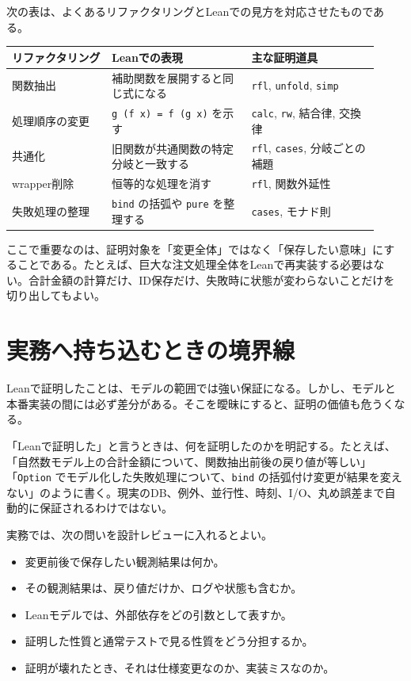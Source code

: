 次の表は、よくあるリファクタリングとLeanでの見方を対応させたものである。

\begin{longtable}{p{0.25\linewidth}p{0.35\linewidth}p{0.32\linewidth}}
\toprule
リファクタリング & Leanでの表現 & 主な証明道具 \\
\midrule
関数抽出 & 補助関数を展開すると同じ式になる & \texttt{rfl}, \texttt{unfold}, \texttt{simp} \\
処理順序の変更 & \texttt{g (f x) = f (g x)} を示す & \texttt{calc}, \texttt{rw}, 結合律, 交換律 \\
共通化 & 旧関数が共通関数の特定分岐と一致する & \texttt{rfl}, \texttt{cases}, 分岐ごとの補題 \\
wrapper削除 & 恒等的な処理を消す & \texttt{rfl}, 関数外延性 \\
失敗処理の整理 & \texttt{bind} の括弧や \texttt{pure} を整理する & \texttt{cases}, モナド則 \\
\bottomrule
\end{longtable}

ここで重要なのは、証明対象を「変更全体」ではなく「保存したい意味」にすることである。たとえば、巨大な注文処理全体をLeanで再実装する必要はない。合計金額の計算だけ、ID保存だけ、失敗時に状態が変わらないことだけを切り出してもよい。

\section{実務へ持ち込むときの境界線}

Leanで証明したことは、モデルの範囲では強い保証になる。しかし、モデルと本番実装の間には必ず差分がある。そこを曖昧にすると、証明の価値も危うくなる。

\begin{warningbox}
「Leanで証明した」と言うときは、何を証明したのかを明記する。たとえば、「自然数モデル上の合計金額について、関数抽出前後の戻り値が等しい」「\texttt{Option} でモデル化した失敗処理について、\texttt{bind} の括弧付け変更が結果を変えない」のように書く。現実のDB、例外、並行性、時刻、I/O、丸め誤差まで自動的に保証されるわけではない。
\end{warningbox}

実務では、次の問いを設計レビューに入れるとよい。

\begin{itemize}
\item 変更前後で保存したい観測結果は何か。
\item その観測結果は、戻り値だけか、ログや状態も含むか。
\item Leanモデルでは、外部依存をどの引数として表すか。
\item 証明した性質と通常テストで見る性質をどう分担するか。
\item 証明が壊れたとき、それは仕様変更なのか、実装ミスなのか。
\end{itemize}


